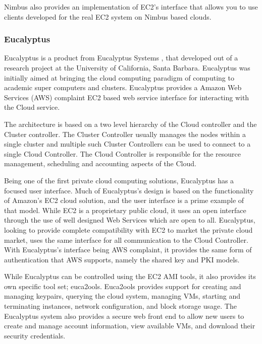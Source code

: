 Nimbus also provides an implementation of EC2's interface that allows you to use clients developed for the real EC2 system on Nimbus based clouds.

\subsubsection{Eucalyptus}


Eucalyptus is a product from Eucalyptus Systems  \cite{nurmi2008eos, eucapyltuswp, www/eucalyptus}, that developed out of a research project at the University of California, Santa Barbara. Eucalyptus was initially aimed at bringing the cloud computing paradigm of computing to academic super computers and clusters. Eucalyptus provides a Amazon Web Services (AWS) complaint EC2 based web service interface for interacting with the Cloud service. %

 
The architecture is based on a two level hierarchy of the Cloud controller and the Cluster controller. The Cluster Controller usually manages the nodes within a single cluster and multiple such Cluster Controllers can be used to connect to a single Cloud Controller. The Cloud Controller is responsible for the resource management, scheduling and accounting aspects of the Cloud.
 
Being one of the first private cloud computing solutions, Eucalyptus has a focused user interface.  Much of Eucalyptus's design is based on the functionality of Amazon's EC2 cloud solution, and the user interface is a prime example of that model.  While EC2 is a proprietary public cloud, it uses an open interface through the use of well designed Web Services which are open to all. Eucalyptus, looking to provide complete compatibility with EC2 to market the private cloud market, uses the same interface for all communication to the Cloud Controller.  With Eucalyptus's interface being AWS complaint, it provides the same form of authentication that AWS supports, namely the shared key and PKI  models.%

While Eucalyptus can be controlled using the EC2 AMI tools, it also provides its own specific tool set; euca2ools. Euca2ools provides support for creating and managing keypairs, querying the cloud system, managing VMs, starting and terminating instances, network configuration, and block storage usage.  The Eucalyptus system also provides a secure web front end to allow new users to create and manage account information, view available VMs, and download their security credentials. 

